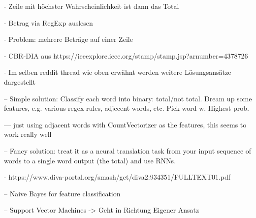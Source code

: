 - Zeile mit höchster Wahrscheinlichkeit ist dann das Total

- Betrag via RegExp auslesen

- Problem: mehrere Beträge auf einer Zeile




- CBR-DIA aus https://ieeexplore.ieee.org/stamp/stamp.jsp?arnumber=4378726


- Im selben reddit thread wie oben erwähnt werden weitere Lösungsansätze dargestellt

-- Simple solution: Classify each word into binary: total/not total. Dream up some features, e.g. various regex rules, adjecent words, etc. Pick word w. Highest prob.

--- just using adjacent words with CountVectorizer as the features, this seems to work really well

-- Fancy solution: treat it as a neural translation task from your input sequence of words to a single word output (the total) and use RNNs.


- https://www.diva-portal.org/smash/get/diva2:934351/FULLTEXT01.pdf

-- Naive Bayes for feature classification

-- Support Vector Machines -> Geht in Richtung Eigener Ansatz